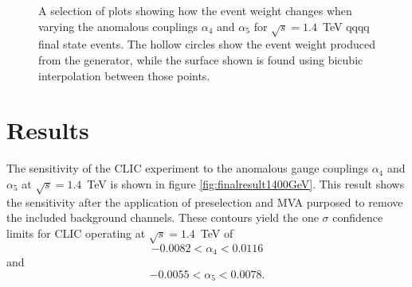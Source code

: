 \begin{figure}[h!]
\caption[A selection of plots showing how the event weight changes when varying the anomalous couplings $\alpha_{4}$ and $\alpha_{5}$ for $\sqrt{s}=1.4$~TeV \nu{\nu}qqqq final state events.  The hollow circles show the event weight produced from the generator, while the surface shown is found using bicubic interpolation between those points.]{A selection of plots showing how the event weight changes when varying the anomalous couplings $\alpha_{4}$ and $\alpha_{5}$ for $\sqrt{s}=1.4$~TeV \nu{\nu}qqqq final state events.  The hollow circles show the event weight produced from the generator, while the surface shown is found using bicubic interpolation between those points.}
\label{fig:eventweights1400interpolated}
\end{figure}


\section{Results}
The sensitivity of the CLIC experiment to the anomalous gauge couplings $\alpha_{4}$ and $\alpha_{5}$ at $\sqrt{s}=1.4$~TeV is shown in figure \ref{fig:finalresult1400GeV}.  This result shows the sensitivity after the application of preselection and MVA purposed to remove the included background channels.  These contours yield the one $\sigma$ confidence limits for CLIC operating at $\sqrt{s}=1.4$~TeV of
%
\begin{equation}
-0.0082 < \alpha_{4} < 0.0116 
\end{equation}
\noindent and 
\begin{equation}
-0.0055 < \alpha_{5} < 0.0078 \text{.}
\end{equation}
%

